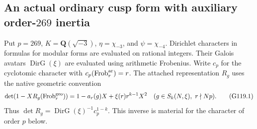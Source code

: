 \subsection{An actual ordinary cusp form with auxiliary order-$269$ inertia}
\label{sec:cubic-auxiliary-order269-seed}

Put $p=269$, $K=\mathbf Q(\sqrt{-3})$, $\eta=\chi_{-3}$,
and $\psi=\chi_{-4}$.  Dirichlet characters in formulas for modular
forms are evaluated on rational integers.  Their Galois avatars
$\operatorname{DirG}(\xi)$ are evaluated using arithmetic Frobenius.
Write $c_p$ for the cyclotomic character with
$c_p(\operatorname{Frob}^{\rm ar}_r)=r$.
The attached representation $R_g$ uses the native geometric convention
\[
 \det(1-XR_g(\operatorname{Frob}^{\rm geo}_r))
 =1-a_r(g)X+\xi(r)r^{k-1}X^2
 \quad(g\in S_k(N,\xi),\ r\nmid Np).
 \tag{G119.1}
\]
Thus $\det R_g=\operatorname{DirG}(\xi)^{-1}c_p^{1-k}$.
This inverse is material for the character of order $p$ below.


